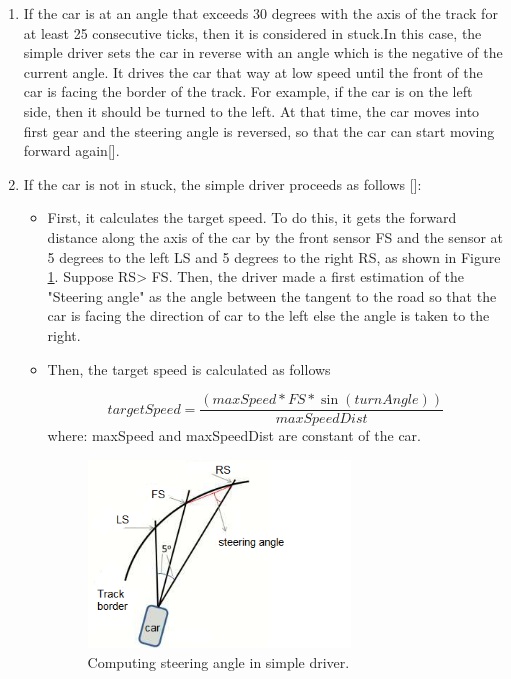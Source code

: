 \documentclass{llncs}
\begin{document}
\begin{enumerate}
	
	
	\item 	If the car is at an angle that exceeds 30 degrees with the axis of the track  for at least 25 consecutive ticks, then it is considered in stuck.In this case, the simple driver sets the car in reverse with an angle which is the negative of the current angle. It drives the car that way at low speed until the front of the car is facing the border of the track. For example, if the car is on the left side, then it should be turned to the left. At that time, the car moves into first gear and the steering angle is reversed, so that the car can start moving forward again[\cite{torcs2}]. \\
	\item 	If the car is not in stuck, the simple driver proceeds as follows  [\cite{torcs2}]:\\
	\begin{itemize}
		\item 	First, it calculates the target speed. To do this, it gets the forward distance along the axis of the car by the front sensor FS and the sensor at 5 degrees to the left LS and 5 degrees to the right RS, as shown in Figure \ref {fig342}. Suppose RS> FS. Then, the driver made a first estimation of the "Steering angle" as the angle between the tangent to the road so that the car is facing the direction of car to the left else the angle is taken to the right. 
		
		\item Then, the target speed is calculated as follows
		
		\begin{equation}
		targetSpeed = \frac{(maxSpeed*FS*\sin(turnAngle))}{maxSpeedDist}
		\end{equation}	
		where: 	maxSpeed and maxSpeedDist are constant of the car.
		\begin{figure}[h!]
			
			\centering
			\includegraphics[width=0.7\textwidth]{fig/sensor02.png}
			\begin{minipage}{10cm}
				\centering
				\caption{\footnotesize Computing steering angle in simple driver.}
				\label{fig342}
			\end{minipage} 
		\end{figure}
	\end{itemize}		
	
\end{enumerate}
\end{document}
